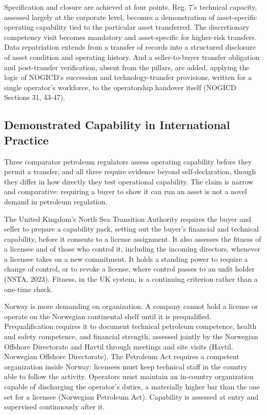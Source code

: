 Specification and closure are achieved at four points. Reg. 7's
technical capacity, assessed largely at the corporate level, becomes a
demonstration of asset-specific operating capability tied to the
particular asset transferred. The discretionary competency visit becomes
mandatory and asset-specific for higher-risk transfers. Data
repatriation extends from a transfer of records into a structured
disclosure of asset condition and operating history. And a
seller-to-buyer transfer obligation and post-transfer verification,
absent from the pillars, are added, applying the logic of NOGICD's
succession and technology-transfer provisions, written for a single
operator's workforce, to the operatorship handover itself (NOGICD
Sections 31, 43-47).

\hypertarget{demonstrated-capability-in-international-practice}{%
\subsection{Demonstrated Capability in International
Practice}\label{demonstrated-capability-in-international-practice}}

Three comparator petroleum regulators assess operating capability before
they permit a transfer, and all three require evidence beyond
self-declaration, though they differ in how directly they test
operational capability. The claim is narrow and comparative: requiring a
buyer to show it can run an asset is not a novel demand in petroleum
regulation.

The United Kingdom's North Sea Transition Authority requires the buyer
and seller to prepare a capability pack, setting out the buyer's
financial and technical capability, before it consents to a license
assignment. It also assesses the fitness of a licensee and of those who
control it, including the incoming directors, whenever a licensee takes
on a new commitment. It holds a standing power to require a change of
control, or to revoke a license, where control passes to an unfit holder
(NSTA, 2023). Fitness, in the UK system, is a continuing criterion
rather than a one-time check.

Norway is more demanding on organization. A company cannot hold a
license or operate on the Norwegian continental shelf until it is
prequalified. Prequalification requires it to document technical
petroleum competence, health and safety competence, and financial
strength, assessed jointly by the Norwegian Offshore Directorate and
Havtil through meetings and site visits (Havtil. Norwegian Offshore
Directorate). The Petroleum Act requires a competent organization inside
Norway: licensees must keep technical staff in the country able to
follow the activity. Operators must maintain an in-country organization
capable of discharging the operator's duties, a materially higher bar
than the one set for a licensee (Norwegian Petroleum Act). Capability is
assessed at entry and supervised continuously after it.

